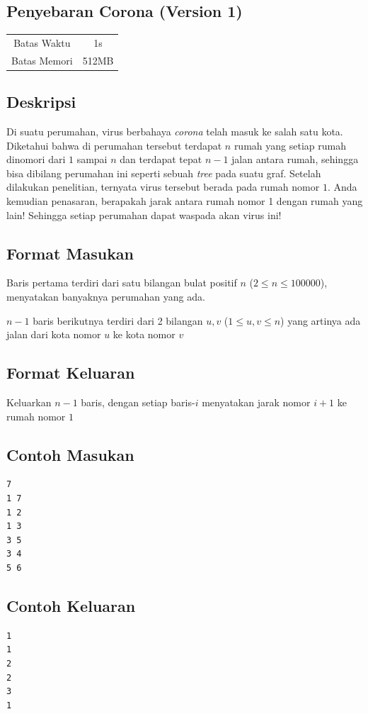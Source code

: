 \documentclass{article}
\begin{document}
\begin{center}
    \section*{Penyebaran Corona (Version 1)} %

    \begin{tabular}{ | c c | }
        \hline
        Batas Waktu  & 1s \\    %
        Batas Memori & 512MB \\  %
        \hline
    \end{tabular}
\end{center}

\subsection*{Deskripsi}

Di suatu perumahan, virus berbahaya \textit{corona} telah masuk ke salah satu kota. Diketahui bahwa di perumahan tersebut terdapat $n$ rumah yang setiap rumah dinomori dari $1$ sampai $n$ dan terdapat tepat $n - 1$ jalan antara rumah, sehingga bisa dibilang perumahan ini seperti sebuah \textit{tree} pada suatu graf. Setelah dilakukan penelitian, ternyata virus tersebut berada pada rumah nomor $1$. Anda kemudian penasaran, berapakah jarak antara rumah nomor 1 dengan rumah yang lain! Sehingga setiap perumahan dapat waspada akan virus ini!

\subsection*{Format Masukan}

Baris pertama terdiri dari satu bilangan bulat positif $n$ ($2 \leq n \leq 100000$), menyatakan banyaknya perumahan yang ada.

$n-1$ baris berikutnya terdiri dari 2 bilangan $u, v$ ($1 \leq u, v \leq n$) yang artinya ada jalan dari kota nomor $u$ ke kota nomor $v$

\subsection*{Format Keluaran}

Keluarkan $n - 1$ baris, dengan setiap baris-$i$ menyatakan jarak nomor $i + 1$ ke rumah nomor $1$

\begin{multicols}{2}
\subsection*{Contoh Masukan}
\begin{lstlisting}
7
1 7
1 2
1 3
3 5
3 4
5 6
\end{lstlisting}
\columnbreak
\subsection*{Contoh Keluaran}
\begin{lstlisting}
1
1
2
2
3
1
\end{lstlisting}
\vfill
\null
\end{multicols}
\end{document}
